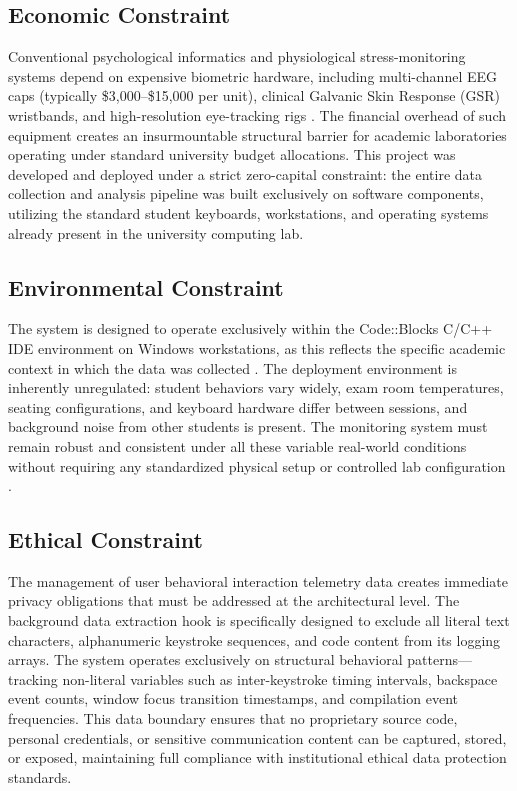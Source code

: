 \subsection{Economic Constraint}
Conventional psychological informatics and physiological stress-monitoring systems depend on expensive biometric hardware, including multi-channel EEG caps (typically \$3,000--\$15,000 per unit), clinical Galvanic Skin Response (GSR) wristbands, and high-resolution eye-tracking rigs \cite{mdpi389, core579951358}. The financial overhead of such equipment creates an insurmountable structural barrier for academic laboratories operating under standard university budget allocations. This project was developed and deployed under a strict zero-capital constraint: the entire data collection and analysis pipeline was built exclusively on software components, utilizing the standard student keyboards, workstations, and operating systems already present in the university computing lab.

\subsection{Environmental Constraint}
The system is designed to operate exclusively within the Code::Blocks C/C++ IDE environment on Windows workstations, as this reflects the specific academic context in which the data was collected \cite{acm4897123}. The deployment environment is inherently unregulated: student behaviors vary widely, exam room temperatures, seating configurations, and keyboard hardware differ between sessions, and background noise from other students is present. The monitoring system must remain robust and consistent under all these variable real-world conditions without requiring any standardized physical setup or controlled lab configuration \cite{researchgateKeystroke}.

\subsection{Ethical Constraint}
The management of user behavioral interaction telemetry data creates immediate privacy obligations that must be addressed at the architectural level. The background data extraction hook is specifically designed to exclude all literal text characters, alphanumeric keystroke sequences, and code content from its logging arrays. The system operates exclusively on structural behavioral patterns—tracking non-literal variables such as inter-keystroke timing intervals, backspace event counts, window focus transition timestamps, and compilation event frequencies. This data boundary ensures that no proprietary source code, personal credentials, or sensitive communication content can be captured, stored, or exposed, maintaining full compliance with institutional ethical data protection standards.

